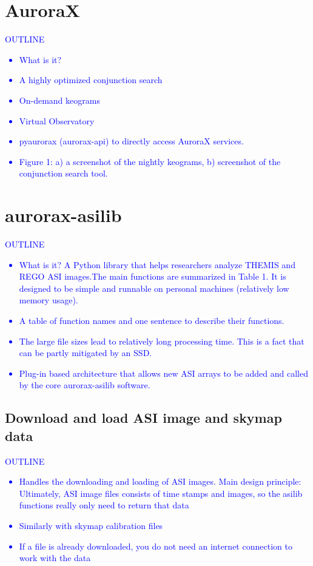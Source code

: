 \documentclass[draft]{agujournal2019}
\begin{document}
\section{AuroraX}\label{aurorax}
\textcolor{blue}{
      OUTLINE
      \begin{itemize}
            \item What is it?
            \item A highly optimized conjunction search
            \item On-demand keograms
            \item Virtual Observatory
            \item pyaurorax (aurorax-api) to directly access AuroraX services.
            \item Figure 1: a) a screenshot of the nightly keograms, b) screenshot of the conjunction search tool. 
      \end{itemize}
}

\section{aurorax-asilib}\label{aurorax-asilib}
\textcolor{blue}{
      OUTLINE
      \begin{itemize}
            \item What is it? A Python library that helps researchers analyze THEMIS and REGO ASI images.The main functions are summarized in Table 1. It is designed to be simple and runnable on personal machines (relatively low memory usage).
            \item A table of function names and one sentence to describe their functions.
            \item The large file sizes lead to relatively long processing time. This is a fact that can be partly mitigated by an SSD. 
            \item Plug-in based architecture that allows new ASI arrays to be added and called by the core aurorax-asilib software.
      \end{itemize}
}
\subsection{Download and load ASI image and skymap data}
\textcolor{blue}{
      OUTLINE
      \begin{itemize}
            \item Handles the downloading and loading of ASI images. Main design principle: Ultimately, ASI image files consists of time stamps and images, so the asilib functions really only need to return that data
            \item Similarly with skymap calibration files
            \item If a file is already downloaded, you do not need an internet connection to work with the data
      \end{itemize}
}
\end{document}
